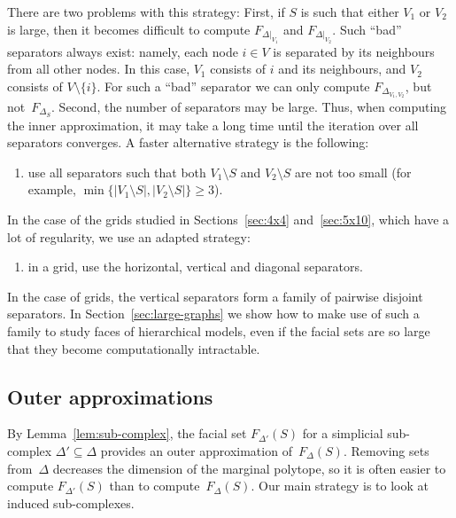 \documentclass[aos,noinfoline]{imsart}
\newcommand{\face}{F}
\theoremstyle{remark}
\theoremstyle{definition}
\begin{document}
There are two problems with this strategy: First, if $S$ is such that either $V_{1}$ or $V_{2}$ is large, then it
becomes difficult to compute $\face_{\Delta|_{V_{1}}}$ and $\face_{\Delta|_{V_{2}}}$.  Such
``bad'' separators always exist: namely, each node $i\in V$ is separated by its neighbours from all other nodes.  In
this case, $V_{1}$ consists of $i$ and its neighbours, and $V_{2}$ consists of $V\setminus\{i\}$.  For such a ``bad''
separator we can only compute $\face_{\Delta_{V_{1},V_{2}}}$, but not~$\face_{\Delta_{S}}$.  Second, the number of
separators may be large.
Thus, when computing the inner approximation, it may take a long time until the iteration over all separators converges.
%
A faster alternative strategy is the following:
\begin{enumerate}[resume]
\item use all separators such that both $V_{1}\setminus S$ and $V_{2}\setminus S$ are not too small (for example,
  $\min\{|V_{1}\setminus S|,|V_{2}\setminus S|\}\ge 3$).
  \label{strat:good-separators}
\end{enumerate}

In the case of the grids studied in Sections~\ref{sec:4x4} and~\ref{sec:5x10}, which have a lot of regularity, we use an
adapted strategy:
\begin{enumerate}[resume]
\item in a grid, use the horizontal, vertical and diagonal separators.
\label{strat:regular-separators}
\end{enumerate}
In the case of grids, the vertical separators form a family of pairwise disjoint separators.  In
Section~\ref{sec:large-graphs} we show how to make use of such a family to study faces of hierarchical models, even
if the facial sets are so large that they become computationally intractable.

\subsection{Outer approximations}
\label{sec:outer-approximations}

By Lemma~\ref{lem:sub-complex}, the facial set $\face_{\Delta'}(S)$ for a simplicial sub-complex
$\Delta'\subseteq\Delta$ provides an outer approximation of~$\face_\Delta(S)$.  Removing sets from~$\Delta$ decreases
the dimension of the marginal polytope, so it is often easier to compute $\face_{\Delta'}(S)$ than to
compute~$\face_\Delta(S)$.  Our main strategy is to look at induced sub-complexes.
\end{document}
